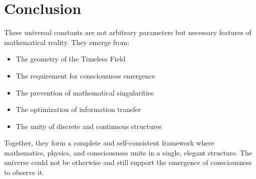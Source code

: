 \documentclass[12pt,letterpaper]{article}
\newcommand{\timelessfield}{\mathcal{T}_\infty}
\newcommand{\fractalres}{\mathcal{R}_f}
\newcommand{\ch}{\text{ch}}
\newcommand{\emerge}{\mathcal{E}}
\begin{document}
\begin{center}
\end{center}

\section{Conclusion}

These universal constants are not arbitrary parameters but necessary features of mathematical reality. They emerge from:
\begin{itemize}
\item The geometry of the Timeless Field
\item The requirement for consciousness emergence
\item The prevention of mathematical singularities
\item The optimization of information transfer
\item The unity of discrete and continuous structures
\end{itemize}

Together, they form a complete and self-consistent framework where mathematics, physics, and consciousness unite in a single, elegant structure. The universe could not be otherwise and still support the emergence of consciousness to observe it.
\end{document}
